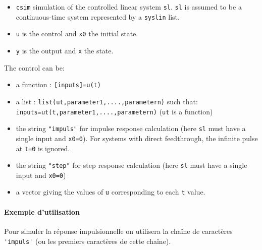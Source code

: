 \begin{doc}
\begin{itemize}
\begin{itemize}
        \item \verb?csim? simulation of the controlled linear system \verb?sl?.
              \verb?sl? is assumed to be a continuous-time system represented 
              by a \verb?syslin? list.
        \item \verb?u?  is the control and \verb?x0? the initial state.
        \item \verb?y?  is the output and \verb?x? the state.
    \end{itemize}
    The control can be:
    \begin{itemize}
        \item a function : \verb?[inputs]=u(t)?
        \item a list : \verb?list(ut,parameter1,....,parametern)? such that:
              \verb?inputs=ut(t,parameter1,....,parametern)? 
    (\verb?ut? is a function)
        \item the string \verb?"impuls"? for impulse response calculation 
              (here \verb?sl? must have a single input and \verb?x0=0?). 
              For systems with direct feedthrough, the infinite pulse at 
              \verb?t=0? is ignored.
        \item the string \verb?"step"? for step response calculation (here 
              \verb?sl? must have a single input and \verb?x0=0?)
        \item a vector giving the values of \verb?u? corresponding to each 
              \verb?t? value.
    \end{itemize}
\end{itemize}
\end{doc}
\paragraph{Exemple d'utilisation}
Pour simuler la réponse impulsionnelle on utilisera la chaîne de caractères 
\verb?'impuls'? (ou les premiers caractères de cette chaîne). 

